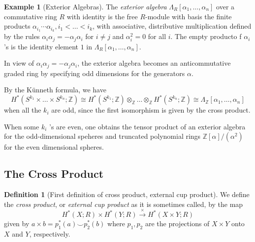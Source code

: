 \documentclass[reqno]{amsart}
\theoremstyle{definition}
\newtheorem{definition}[theorem]{Definition}
\newtheorem{example}[theorem]{Example}
\theoremstyle{remark}
\begin{document}
    \begin{example}[Exterior Algebras]
        The \textit{exterior algebra}
        $\Lambda_R \left[ \alpha_1, \ldots, \alpha_n \right] $ 
        over a commutative ring $R$ with identity
        is the free $R$-module with basis
        the finite products
        $\alpha_{i_1} \cdots \alpha_{i_k},
        i_1 < \ldots < i_k$, with associative,
        distributive multiplication defined by
        the rules
        $\alpha_i \alpha_j = - \alpha_j \alpha_i$ for
        $i\neq j$ and
        $\alpha_i^2 = 0$ for all $i$.
        The empty producto f $\alpha_i$ 's is the identity
        element $1$ in
        $\Lambda_R \left[ \alpha_1, \ldots, \alpha_n \right] $.

        In view of
        $\alpha_i \alpha_j = - \alpha_j \alpha_i$,
        the exterior algebra becomes an
        anticommutative graded ring by specifying
        odd dimensions for the generators
        $\alpha$.

        By the Künneth formula, we have
        \[
        H^{*}\left( S^{k_1} \times 
        \ldots \times S^{k_n} ; \mathbb{Z}\right) 
        \cong
        H^{*}(S^{k_1} ; \mathbb{Z}) \otimes_{\mathbb{Z}} \ldots
        \otimes_{\mathbb{Z}} H^{*}(S^{k_n};\mathbb{Z})
        \cong \Lambda_{\mathbb{Z}}
        \left[ \alpha_1, \ldots, \alpha_n \right] 
        \] 
        when all the $k_i$ are odd,
        since the first isomorphism
        is given by the cross product.

        When some $k_i$ 's are even, one obtains
        the tensor product of an exterior algebra
        for the odd-dimensional speheres and truncated
        polynomial rings
        $\mathbb{Z} \left[ \alpha \right] /
        \left( \alpha^2 \right) $ for the even
        dimensional spheres.
    \end{example}

    \subsection{The Cross Product}
    
    \begin{definition}[First definition of cross product,
        external cup product]
        We define the \textit{cross product}, or
        \textit{external cup product} as it is
        sometimes called, by
        the map
        \[
        H^{*}(X;R) \times H^{*}(Y;R) \stackrel{\times }{\to} 
        H^{*}\left( X \times Y; R \right) 
        \] 
        given by
        $a \times b = p_1^{*}(a) \smile p_2^{*}(b)$ where
        $p_1, p_2$ are the projections of
        $X \times Y$ onto $X$ and $Y$, respectively.
    \end{definition}
\end{document}
